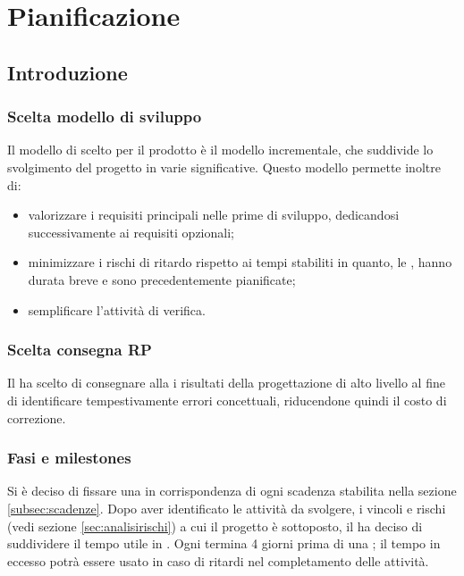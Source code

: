 \section {Pianificazione}
\subsection {Introduzione}
	\subsubsection{Scelta modello di sviluppo}
	Il modello di  scelto per il prodotto è il modello incrementale, che suddivide lo
	svolgimento del progetto in varie  significative. Questo modello permette inoltre di:
	\begin{itemize}
		\item valorizzare i requisiti principali nelle prime  di sviluppo, dedicandosi successivamente
		ai requisiti opzionali;
		\item minimizzare i rischi di ritardo rispetto ai tempi stabiliti in quanto, le , hanno durata
		breve e sono precedentemente pianificate;
		\item semplificare l’attività di verifica.
	\end{itemize}
	\subsubsection {Scelta consegna RP}
	Il  ha scelto di consegnare alla \revprog{} i risultati della progettazione di alto livello al fine di identificare tempestivamente errori concettuali, riducendone quindi il costo di correzione.
	\subsubsection{Fasi e milestones}
	Si è deciso di fissare una  in corrispondenza di ogni scadenza stabilita nella sezione \ref{subsec:scadenze}. Dopo aver identificato le attività da svolgere, i vincoli e rischi (vedi sezione \ref{sec:analisirischi}) a cui il progetto è sottoposto, il  ha deciso di suddividere il tempo utile in . Ogni  termina 4 giorni prima di una ; il tempo in eccesso potrà essere usato in caso di ritardi nel completamento delle attività.\\

